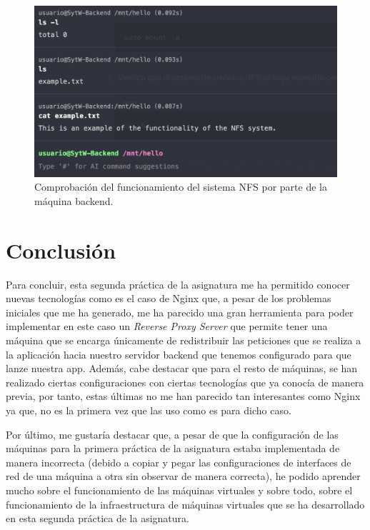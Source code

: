 \documentclass{report}
\begin{document}
  \begin{figure}[H]
    \centering
    \includegraphics[scale=0.6]{Capturas-Informe-2-STW/Funcionamiento-sistema-NFS-Backend.png}
    \caption{Comprobación del funcionamiento del sistema NFS por parte de la máquina backend.}
    \label{fig:Comprobación-NFS-Backend}
  \end{figure}

  \chapter{Conclusión}
  Para concluir, esta segunda práctica de la asignatura me ha permitido conocer nuevas tecnologías como es el caso de Nginx que, a pesar de los problemas iniciales que me ha generado, me ha parecido una gran herramienta para poder implementar en este caso un \emph{Reverse Proxy Server} que permite tener una máquina que se encarga únicamente de redistribuir las peticiones que se realiza a la aplicación hacia nuestro servidor backend que tenemos configurado para que lanze nuestra app. Además, cabe destacar que para el resto de máquinas, se han realizado ciertas configuraciones con ciertas tecnologías que ya conocía de manera previa, por tanto, estas últimas no me han parecido tan interesantes como Nginx ya que, no es la primera vez que las uso como es para dicho caso. 
  
  Por último, me gustaría destacar que, a pesar de que la configuración de las máquinas para la primera práctica de la asignatura estaba implementada de manera incorrecta (debido a copiar y pegar las configuraciones de interfaces de red de una máquina a otra sin observar de manera correcta), he podido aprender mucho sobre el funcionamiento de las máquinas virtuales y sobre todo, sobre el funcionamiento de la infraestructura de máquinas virtuales que se ha desarrollado en esta segunda práctica de la asignatura.

  
\end{document}
